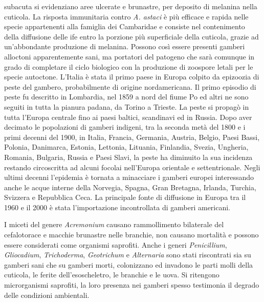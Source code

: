 \documentclass[11pt,a4paper,italian,twoside,openany]{memoir}
\begin{document}
\begin{enumerate}[label={\alph*)}]
subacuta si evidenziano aree ulcerate e brunastre, per deposito di melanina nella cuticola. La risposta immunitaria contro \emph{A. astaci} è più efficace e rapida nelle specie appartenenti alla famiglia dei Cambaridae e consiste nel contenimento della diffusione delle ife entro la porzione più superficiale della cuticola, grazie ad un'abbondante produzione di melanina. Possono così essere presenti gamberi alloctoni apparentemente sani, ma portatori del patogeno che sarà comunque in grado di completare il ciclo biologico con la produzione di zoospore letali per le specie autoctone. L'Italia è stata il primo paese in Europa colpito da epizoozia di peste del gambero, probabilmente di origine nordamericana. Il primo episodio di peste fu descritto in Lombardia, nel 1859 a nord del fiume Po ed altri ne sono seguiti in tutta la pianura padana, da Torino a Trieste. La peste si propagò in tutta l'Europa centrale fino ai paesi baltici, scandinavi ed in Russia. Dopo aver decimato le popolazioni di gamberi indigeni, tra la seconda metà del 1800 e i primi decenni del 1900, in Italia, Francia, Germania, Austria, Belgio, Paesi Bassi, Polonia, Danimarca, Estonia, Lettonia, Lituania, Finlandia, Svezia, Ungheria, Romania, Bulgaria, Russia e Paesi Slavi, la peste ha diminuito la sua incidenza restando circoscritta ad alcuni focolai nell'Europa orientale e settentrionale. Negli ultimi decenni l'epidemia è tornata a minacciare i gamberi europei interessando anche le acque interne della Norvegia, Spagna, Gran Bretagna, Irlanda, Turchia, Svizzera e Repubblica Ceca. La principale fonte di diffusione in Europa tra il 1960 e il 2000 è stata l'importazione incontrollata di gamberi americani.

  I miceti del genere \emph{Acremonium} causano rammollimento bilaterale del cefalotorace e macchie brunastre nelle branchie, non causano mortalità e possono essere considerati come organismi saprofiti. Anche i generi \emph{Penicillium}, \emph{Gliocadium}, \emph{Trichoderma}, \emph{Geotrichum} e \emph{Alternaria} sono stati riscontrati sia su gamberi sani che su gamberi morti, colonizzano ed invadono le parti molli della cuticola, le ferite dell'esoscheletro, le branchie e le uova. Si ritengono microrganismi saprofiti, la loro presenza nei gamberi spesso testimonia il degrado delle condizioni ambientali.


\end{enumerate}
\end{document}
